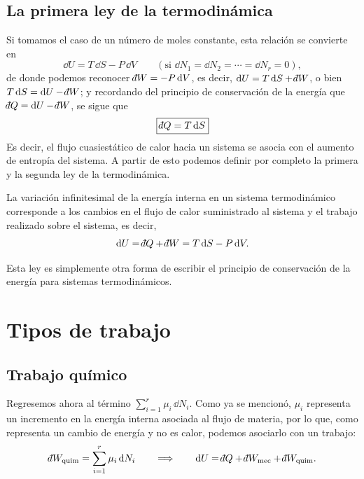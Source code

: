\subsection*{La primera ley de la termodinámica}

Si tomamos el caso de un número de moles constante, esta relación se convierte en
\begin{equation*}
  \dd U=T\,\dd S-P\,\dd V\qquad(\text{si }\dd N_1=\dd N_2=\cdots=\dd N_r=0),
\end{equation*}
de donde podemos reconocer $\dbar W=-P\,\dd V$, es decir, $\dd U=T\,\dd S+\dbar W$, o bien
$T\,\dd S=\dd U-\dbar W$; y recordando del principio de conservación de la energía que
$\dbar Q=\dd U-\dbar W$, se sigue que
\begin{equation*}
  \boxed{\dbar Q=T\,\dd S}
\end{equation*}
Es decir, el flujo cuasiestático de calor hacia un sistema se asocia con el aumento de entropía del
sistema. A partir de esto podemos definir por completo la primera y la segunda ley de la
termodinámica.

\begin{ley}
  La variación infinitesimal de la energía interna en un sistema termodinámico corresponde a los
  cambios en el flujo de calor suministrado al sistema y el trabajo realizado sobre el sistema, es
  decir,
  \begin{equation*}
    \dd U=\dbar Q+\dbar W=T\,\dd S-P\,\dd V.
  \end{equation*}
\end{ley}

Esta ley es simplemente otra forma de escribir el principio de conservación de la energía para
sistemas termodinámicos.

\section{Tipos de trabajo}

\subsection*{Trabajo químico}

Regresemos ahora al término $\sum_{i=1}^{r}\mu_i\,\dd N_i$. Como ya se mencionó, $\mu_i$
representa un incremento en la energía interna asociada al flujo de materia, por lo que, como
representa un cambio de energía y no es calor, podemos asociarlo con un trabajo:
\begin{equation*}
  \dbar W_{\mathrm{quim}}=\sum_{i=1}^{r}\mu_i\,\dd N_i
  \qquad\Longrightarrow\qquad
  \dd U=\dbar Q+\dbar W_{\mathrm{mec}}+\dbar W_{\mathrm{quim}}.
\end{equation*}

